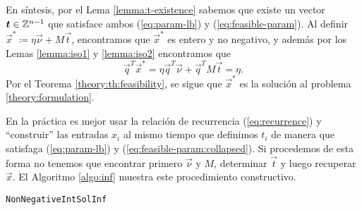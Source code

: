 En síntesis, por el Lema \ref{lemma:t-existence} sabemos que existe un vector
$\boldsymbol{t} \in \mathbb{Z}^{n-1}$ que satisface ambos (\ref{eq:param-lb}) y (\ref{eq:feasible-param}).
Al definir $\vec{x}^* \coloneq \eta\vec{\nu} + M\vec{t}$, encontramos que $\vec{x}^*$ es entero y
no negativo, y además por los Lemas \ref{lemma:iso1} y \ref{lemma:iso2} encontramos que
\begin{equation*}
	\vec{q}^T\vec{x}^* = \eta\vec{q}^T\vec{\nu} + \vec{q}^TM\vec{t} = \eta.
\end{equation*}
Por el Teorema \ref{theory:th:feasibility}, se sigue que $\vec{x}^*$ es la solución al problema
\eqref{theory:formulation}.

En la práctica es mejor usar la relación de recurrencia (\ref{eq:recurrence}) y ``construir'' las
entradas $x_i$ al mismo tiempo que definimos $t_i$ de manera que satisfaga (\ref{eq:param-lb}) y
(\ref{eq:feasible-param:collapsed}). Si procedemos de esta forma no tenemos que encontrar primero
$\vec{\nu}$ y $M$, determinar $\vec{t}$ y luego recuperar $\vec{x}$. El Algoritmo \ref{algo:inf}
muestra este procedimiento constructivo.

\begin{algorithm}[ht]
	\LinesNumbered
	\caption{\texttt{NonNegativeIntSolInf}}
	\label{algo:inf}
\end{algorithm}

